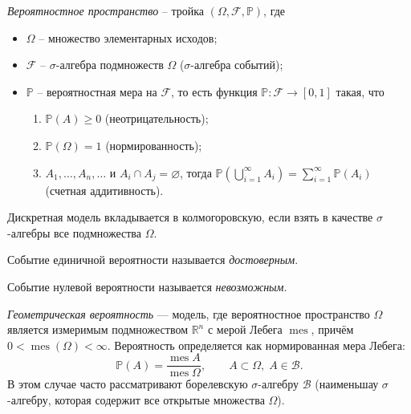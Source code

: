 \documentclass[12pt,a4paper]{article}
\begin{document}
\begin{definition}
    \textit{Вероятностное пространство} -- тройка $\left( \Omega, \mathcal{F}, \mathbb{P} \right)$, где \begin{itemize}
        \item $\Omega$ -- множество элементарных исходов;
        \item $\mathcal{F}$ -- $\sigma$-алгебра подмножеств $\Omega$ ($\sigma$-алгебра событий);
        \item $\mathbb{P}$ -- вероятностная мера на $\mathcal{F}$, то есть функция $\mathbb{P} : \mathcal{F} \to [0, 1]$ такая, что \begin{enumerate}
        \item $\mathbb{P}(A) \geq 0$ (неотрицательность);
        \item $\mathbb{P}(\Omega) = 1$ (нормированность);
        \item $A_1, \ldots, A_n, \ldots \text{ и } A_i \cap A_j = \varnothing$, тогда $\mathbb{P}\left( \bigcup\limits_{i = 1}^{\infty} A_i \right) = \sum\limits_{i=1}^{\infty} \mathbb{P}(A_i)$ (счетная аддитивность).
    \end{enumerate}
    \end{itemize} 
\end{definition}

\begin{remark}
    Дискретная модель вкладывается в колмогоровскую, если взять в качестве $\sigma$-алгебры все подмножества $\Omega$.
\end{remark}

\begin{definition}
    Событие единичной вероятности называется \textit{достоверным}.
\end{definition}

\begin{definition}
    Событие нулевой вероятности называется \textit{невозможным}.
\end{definition}

\begin{definition}
    \textit{Геометрическая вероятность} — модель, где вероятностное пространство $\Omega$ является измеримым подмножеством $\mathbb{R}^n$ с мерой Лебега $\operatorname{mes}$, причём $0 < \operatorname{mes}(\Omega) < \infty$. Вероятность определяется как нормированная мера Лебега: $$\mathbb{P}(A) = \frac{\operatorname{mes}A}{\operatorname{mes}\Omega}, \qquad A \subset \Omega, \; A \in \mathcal{B}.$$ В этом случае часто рассматривают борелевскую $\sigma$-алгебру $\mathcal{B}$ (наименьшау $\sigma$-алгебру, которая содержит все открытые множества $\Omega$). 
\end{definition}
\end{document}
